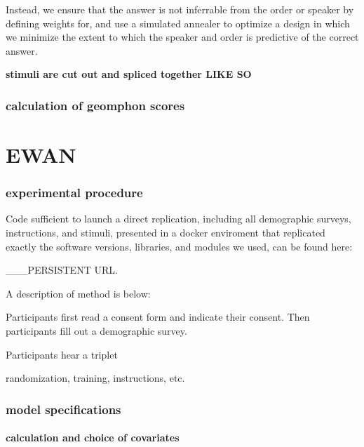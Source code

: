 \documentclass[]{article}
\let\oldparagraph\paragraph
\renewcommand{\paragraph}[1]{\oldparagraph{#1}\mbox{}}
\begin{document}
Instead, we ensure that the answer is not inferrable from the order or
speaker by defining weights for, and use a simulated annealer to
optimize a design in which we minimize the extent to which the speaker
and order is predictive of the correct answer.

\textbf{stimuli are cut out and spliced together LIKE SO}

\hypertarget{calculation-of-geomphon-scores}{%
\subsubsection{calculation of geomphon
scores}\label{calculation-of-geomphon-scores}}

\hypertarget{ewan}{%
\section{\texorpdfstring{\textbf{EWAN}}{EWAN}}\label{ewan}}

\hypertarget{experimental-procedure}{%
\subsubsection{experimental procedure}\label{experimental-procedure}}

Code sufficient to launch a direct replication, including all
demographic surveys, instructions, and stimuli, presented in a docker
enviroment that replicated exactly the software versions, libraries, and
modules we used, can be found here:

\_\_\_PERSISTENT URL.

A description of method is below:

Participants first read a consent form and indicate their consent. Then
participants fill out a demographic survey.

Participants hear a triplet

randomization, training, instructions, etc.

\hypertarget{model-specifications}{%
\subsubsection{model specifications}\label{model-specifications}}

\hypertarget{calculation-and-choice-of-covariates}{%
\paragraph{calculation and choice of
covariates}\label{calculation-and-choice-of-covariates}}
\end{document}
